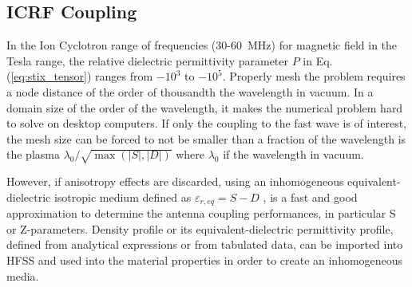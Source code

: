 \subsection{ICRF Coupling}
In the Ion Cyclotron range of frequencies (30-60~MHz) for magnetic field in the Tesla range, the relative dielectric permittivity parameter $P$ in Eq.(\ref{eq:stix_tensor}) ranges from $-10^3$ to $-10^5$. Properly mesh the problem requires a node distance of the order of thousandth the wavelength in vacuum. In a domain size of the order of the wavelength, it makes the numerical problem hard to solve on desktop computers. If only the coupling to the fast wave is of interest, the mesh size can be forced to not be smaller than a fraction of the wavelength is the plasma $\lambda_0/\sqrt{\max(|S|, |D|)}$ where $\lambda_0$ if the  wavelength in vacuum. 

However, if anisotropy effects are discarded, using an inhomogeneous equivalent-dielectric isotropic medium  defined as $\varepsilon_{r,eq}=S-D$ \cite{messiaen2011-1}, is a fast and good approximation to determine the antenna coupling performances, in particular S or Z-parameters. Density profile or its equivalent-dielectric permittivity profile, defined from analytical expressions or from tabulated data, can be imported into HFSS  and used into the material properties in order to create an inhomogeneous media. 



